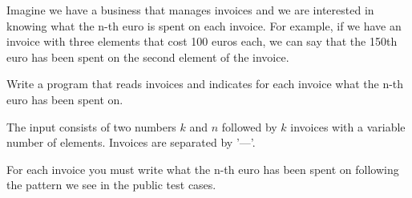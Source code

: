 

\Statement

Imagine we have a business that manages invoices and we are interested in knowing what the n-th euro is spent on each invoice. For example, if we have an invoice with three elements that cost 100 euros each, we can say that the 150th euro has been spent on the second element of the invoice.

Write a program that reads invoices and indicates for each invoice what the n-th euro has been spent on.

\Input

The input consists of two numbers $k$ and $n$ followed by $k$ invoices with a variable number of elements. Invoices are separated by '---'.

\Output

For each invoice you must write what the n-th euro has been spent on following the pattern we see in the public test cases.

\Sample
